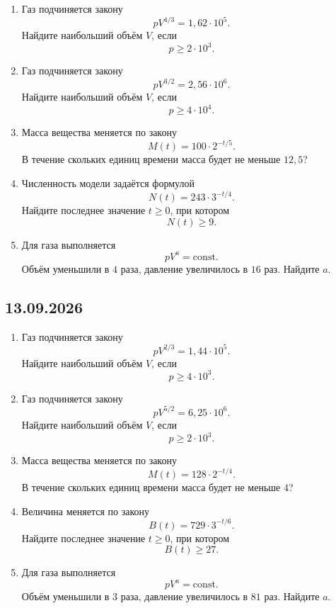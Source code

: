 \documentclass[a4paper,12pt]{article}
\newcommand{\subsect}[1]{%
  \subsection*{\color{accent}#1}%
}
\begin{document}
\begin{enumerate}[label=\arabic*)]

  \item
  Газ подчиняется закону
  \[
  pV^{4/3}=1{,}62\cdot10^5.
  \]
  Найдите наибольший объём $V$, если
  \[
  p\ge2\cdot10^3.
  \]

  \item
  Газ подчиняется закону
  \[
  pV^{3/2}=2{,}56\cdot10^6.
  \]
  Найдите наибольший объём $V$, если
  \[
  p\ge4\cdot10^4.
  \]

  \item
  Масса вещества меняется по закону
  \[
  M(t)=100\cdot2^{-t/5}.
  \]
  В течение скольких единиц времени масса будет не меньше
  $12{,}5$?

  \item
  Численность модели задаётся формулой
  \[
  N(t)=243\cdot3^{-t/4}.
  \]
  Найдите последнее значение $t\ge0$, при котором
  \[
  N(t)\ge9.
  \]

  \item
  Для газа выполняется
  \[
  pV^a=\mathrm{const}.
  \]
  Объём уменьшили в $4$ раза,
  давление увеличилось в $16$ раз.
  Найдите $a$.

\end{enumerate}


\subsect{13.09.2026}

\begin{enumerate}[label=\arabic*)]

  \item
  Газ подчиняется закону
  \[
  pV^{2/3}=1{,}44\cdot10^5.
  \]
  Найдите наибольший объём $V$, если
  \[
  p\ge4\cdot10^3.
  \]

  \item
  Газ подчиняется закону
  \[
  pV^{5/2}=6{,}25\cdot10^6.
  \]
  Найдите наибольший объём $V$, если
  \[
  p\ge2\cdot10^3.
  \]

  \item
  Масса вещества меняется по закону
  \[
  M(t)=128\cdot2^{-t/4}.
  \]
  В течение скольких единиц времени масса будет не меньше $4$?

  \item
  Величина меняется по закону
  \[
  B(t)=729\cdot3^{-t/6}.
  \]
  Найдите последнее значение $t\ge0$, при котором
  \[
  B(t)\ge27.
  \]

  \item
  Для газа выполняется
  \[
  pV^a=\mathrm{const}.
  \]
  Объём уменьшили в $3$ раза,
  давление увеличилось в $81$ раз.
  Найдите $a$.

\end{enumerate}
\end{document}
